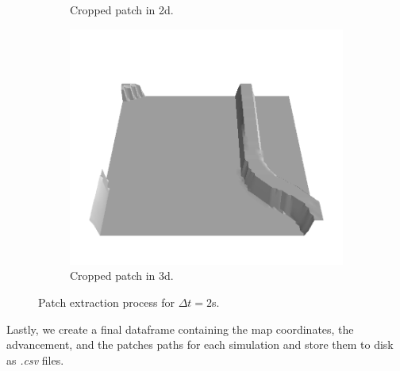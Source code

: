 \documentclass[../document.tex]{subfiles}
\begin{document}
\begin{figure}[htbp]
\begin{subfigure}[b]{0.45\textwidth}
        \caption{Cropped patch in 2d.}
    \end{subfigure}
    \begin{subfigure}[b]{0.45\textwidth}
        \includegraphics[width=\textwidth]{../img/3/crop/0.png}
        \caption{Cropped patch in 3d.}
    \end{subfigure}
\caption{Patch extraction process for $\Delta t = 2$s.}   
\end{figure}
Lastly, we create a final dataframe containing the map coordinates, the advancement, and the patches paths for each simulation and store them to disk as \emph{.csv} files. 
\end{document}

